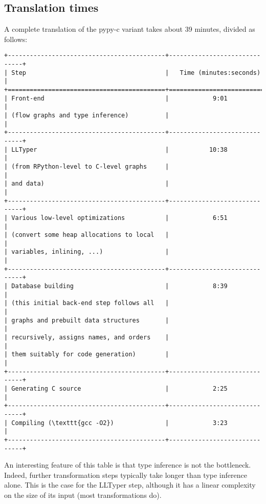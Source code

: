 \documentclass{acm_proc_article-sp}
\begin{document}
\subsection{Translation times}

A complete translation of the pypy-c variant takes about 39 minutes,
divided as follows:

\begin{verbatim}
+-------------------------------------------+------------------------------+
| Step                                      |   Time (minutes:seconds)     |
+===========================================+==============================+
| Front-end                                 |            9:01              |
| (flow graphs and type inference)          |                              |
+-------------------------------------------+------------------------------+
| LLTyper                                   |           10:38              |
| (from RPython-level to C-level graphs     |                              |
| and data)                                 |                              |
+-------------------------------------------+------------------------------+
| Various low-level optimizations           |            6:51              |
| (convert some heap allocations to local   |                              |
| variables, inlining, ...)                 |                              |
+-------------------------------------------+------------------------------+
| Database building                         |            8:39              |
| (this initial back-end step follows all   |                              |
| graphs and prebuilt data structures       |                              |
| recursively, assigns names, and orders    |                              |
| them suitably for code generation)        |                              |
+-------------------------------------------+------------------------------+
| Generating C source                       |            2:25              |
+-------------------------------------------+------------------------------+
| Compiling (\texttt{gcc -O2})              |            3:23              |
+-------------------------------------------+------------------------------+
\end{verbatim}

An interesting feature of this table is that type inference is not the
bottleneck.  Indeed, further transformation steps typically take longer
than type inference alone.  This is the case for the LLTyper step,
although it has a linear complexity on the size of its input (most
transformations do).
\end{document}

